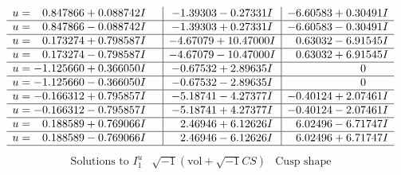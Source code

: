\documentclass[1p]{elsarticle_modified}
\theoremstyle{definition}
\newcommand{\I}{\sqrt{-1}}
\begin{document}
$$\begin{array}{c|c|c}
\begin{aligned}
u &= \phantom{-}0.847866 + 0.088742 I\end{aligned}
 & -1.39303 - 0.27331 I & -6.60583 + 0.30491 I \\ \hline\begin{aligned}
u &= \phantom{-}0.847866 - 0.088742 I\end{aligned}
 & -1.39303 + 0.27331 I & -6.60583 - 0.30491 I \\ \hline\begin{aligned}
u &= \phantom{-}0.173274 + 0.798587 I\end{aligned}
 & -4.67079 + 10.47000 I & \phantom{-}0.63032 - 6.91545 I \\ \hline\begin{aligned}
u &= \phantom{-}0.173274 - 0.798587 I\end{aligned}
 & -4.67079 - 10.47000 I & \phantom{-}0.63032 + 6.91545 I \\ \hline\begin{aligned}
u &= -1.125660 + 0.366050 I\end{aligned}
 & -0.67532 + 2.89635 I & \phantom{-0.000000 } 0 \\ \hline\begin{aligned}
u &= -1.125660 - 0.366050 I\end{aligned}
 & -0.67532 - 2.89635 I & \phantom{-0.000000 } 0 \\ \hline\begin{aligned}
u &= -0.166312 + 0.795857 I\end{aligned}
 & -5.18741 - 4.27377 I & -0.40124 + 2.07461 I \\ \hline\begin{aligned}
u &= -0.166312 - 0.795857 I\end{aligned}
 & -5.18741 + 4.27377 I & -0.40124 - 2.07461 I \\ \hline\begin{aligned}
u &= \phantom{-}0.188589 + 0.769066 I\end{aligned}
 & \phantom{-}2.46946 + 6.12626 I & \phantom{-}6.02496 - 6.71747 I \\ \hline\begin{aligned}
u &= \phantom{-}0.188589 - 0.769066 I\end{aligned}
 & \phantom{-}2.46946 - 6.12626 I & \phantom{-}6.02496 + 6.71747 I\\
 \hline 
 \end{array}$$\newpage$$\begin{array}{c|c|c}  
\text{Solutions to }I^u_{1}& \I (\text{vol} + \sqrt{-1}CS) & \text{Cusp shape}\\

\end{array}$$
\end{document}
